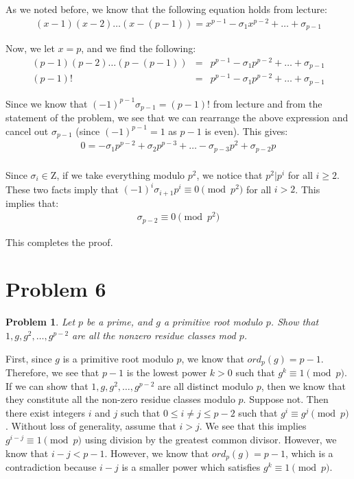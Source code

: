 \documentclass[psamsfonts]{amsart}
\newtheorem{prob}{Problem}[section]
\newenvironment{sol}{{\bfseries Solution}}{\qedsymbol}
\theoremstyle{definition}
\theoremstyle{remark}
\numberwithin{equation}{section}
\begin{document}
\begin{sol}
As we noted before, we know that the following equation holds from lecture:
\begin{eqnarray}
(x-1)(x-2)\ldots(x-(p-1)) = x^{p-1} - \sigma_1 x^{p-2} + \ldots + \sigma_{p-1}
\end{eqnarray}

Now, we let $x = p$, and we find the following:
\begin{eqnarray}
(p-1)(p-2)\ldots(p-(p-1)) &=& p^{p-1} - \sigma_1 p^{p-2} + \ldots + \sigma_{p-1} \\
(p-1)! &=&  p^{p-1} - \sigma_1 p^{p-2} + \ldots + \sigma_{p-1} 
\end{eqnarray}

Since we know that $(-1)^{p-1} \sigma_{p-1} = (p-1)!$ from lecture and from the statement of the problem, we see that we can rearrange the above expression and cancel out $\sigma_{p-1}$ (since $(-1)^{p-1} = 1$ as $p-1$ is even). This gives:
\begin{eqnarray}
0 = -\sigma_1 p^{p-2} + \sigma_2 p^{p-3} + \ldots  - \sigma_{p-3} p^2 + \sigma_{p-2} p \\
\end{eqnarray}

Since $\sigma_{i} \in \mathrm{Z}$, if we take everything modulo $p^2$, we notice that $p^2 | p^{i}$ for all $i \geq 2$. These two facts imply that $(-1)^{i} \sigma_{i+1} p^{i} \equiv 0 \pmod{p^2}$ for all $i > 2$. This implies that:
\begin{eqnarray}
\sigma_{p-2} \equiv 0 \pmod{p^2}
\end{eqnarray}

This completes the proof.
\end{sol}

\section{Problem 6}

\begin{prob}
Let $p$ be a prime, and $g$ a primitive root modulo $p$. Show that $1,g,g^2, \ldots, g^{p-2}$ are all the nonzero residue classes mod $p$.
\end{prob}

\begin{sol}
First, since $g$ is a primitive root modulo $p$, we know that $ord_p(g) = p-1$. Therefore, we see that $p-1$ is the lowest power $k > 0$ such that $g^k \equiv 1 \pmod{p}$. If we can show that $1,g,g^2, \ldots, g^{p-2}$ are all distinct modulo $p$, then we know that they constitute all the non-zero residue classes modulo $p$. Suppose not. Then there exist integers $i$ and $j$ such that $0 \leq i \neq j \leq p - 2$ such that $g^i \equiv g^j \pmod{p}$. Without loss of generality, assume that $i > j$. We see that this implies $g^{i - j} \equiv 1 \pmod{p}$ using division by the greatest common divisor. However, we know that $i - j < p - 1$. However, we know that $ord_p(g) = p - 1$, which is a contradiction because $i-j$ is a smaller power which satisfies $g^k \equiv 1 \pmod{p}$. 
\end{sol}
\end{document}
